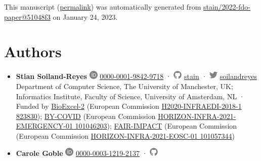 This manuscript
(\href{https://stain.github.io/2022-fdo-paper/v/51048f35d5fce97aa4194e6426fdd7c704f19199/}{permalink})
was automatically generated
from \href{https://github.com/stain/2022-fdo-paper/tree/51048f35d5fce97aa4194e6426fdd7c704f19199}{stain/2022-fdo-paper@51048f3}
on January 24, 2023.

\hypertarget{authors}{%
\section*{Authors}\label{authors}}

\begin{itemize}
\item
  \textbf{Stian Soiland-Reyes}
  \includegraphics[width=0.16667in,height=0.16667in]{images/orcid.svg}
  \href{https://orcid.org/0000-0001-9842-9718}{0000-0001-9842-9718}
  · \includegraphics[width=0.16667in,height=0.16667in]{images/github.svg}
  \href{https://github.com/stain}{stain}
  · \includegraphics[width=0.16667in,height=0.16667in]{images/twitter.svg}
  \href{https://twitter.com/soilandreyes}{soilandreyes}
  Department of Computer Science, The University of Manchester, UK; Informatics Institute, Faculty of Science, University of Amsterdam, NL
  · Funded by \href{https://bioexcel.eu/}{BioExcel-2} (European Commission \href{https://cordis.europa.eu/project/id/823830}{H2020-INFRAEDI-2018-1 823830}); \href{https://by-covid.eu/}{BY-COVID} (European Commission \href{https://cordis.europa.eu/project/id/101046203}{HORIZON-INFRA-2021-EMERGENCY-01 101046203}); \href{http://www.fair-impact.eu/}{FAIR-IMPACT} (European Commission (European Commission \href{https://cordis.europa.eu/project/id/101057344}{HORIZON-INFRA-2021-EOSC-01 101057344})
\item
  \textbf{Carole Goble}
  \includegraphics[width=0.16667in,height=0.16667in]{images/orcid.svg}
  \href{https://orcid.org/0000-0003-1219-2137}{0000-0003-1219-2137}
  · \includegraphics[width=0.16667in,height=0.16667in]{images/github.svg}

\end{itemize}
